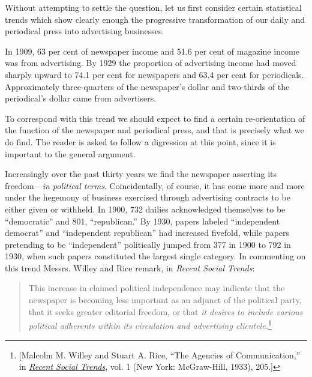 \documentclass[nohyper,openany,nobib]{tufte-book}
\begin{document}
Without attempting to settle the question, let us first consider certain
statistical trends which show clearly enough the progressive
transformation of our daily and periodical press into advertising
businesses.

In 1909, 63 per cent of newspaper income and 51.6 per cent of magazine
income was from advertising. By 1929 the proportion of advertising
income had moved sharply upward to 74.1 per cent for newspapers and 63.4
per cent for periodicals. Approximately three-quarters of the
newspaper's dollar and two-thirds of the periodical's dollar came from
advertisers.

To correspond with this trend we should expect to find a certain
re-orientation of the function of the newspaper and periodical press,
and that is precisely what we do find. The reader is asked to follow a
digression at this point, since it is important to the general argument.

Increasingly over the past thirty years we find the newspaper asserting
its freedom---\emph{in political terms}. Coincidentally, of course, it
has come more and more under the hegemony of business exercised through
advertising contracts to be either given or withheld. In 1900, 732
dailies acknowledged themselves to be ``democratic'' and 801,
``republican.'' By 1930, papers labeled ``independent democrat'' and
``independent republican'' had increased fivefold, while papers
pretending to be ``independent'' politically jumped from 377 in 1900 to
792 in 1930, when such papers constituted the largest single category.
In commenting on this trend Messrs. Willey and Rice remark, in
\emph{Recent Social Trends}:

\begin{quote}
This increase in claimed political independence may indicate that the
newspaper is becoming less important as an adjunct of the political
party, that it seeks greater editorial freedom, or that \emph{it desires
to include various political adherents within its circulation and
advertising clientele.}\footnote{{[}Malcolm M. Willey and Stuart A. Rice, ``The Agencies of
  Communication,'' in
  \emph{\href{http://www.worldcat.org/oclc/544930}{Recent Social
  Trends}}, vol. 1 (New York: McGraw-Hill, 1933), 205.{]}}
\end{quote}
\end{document}
